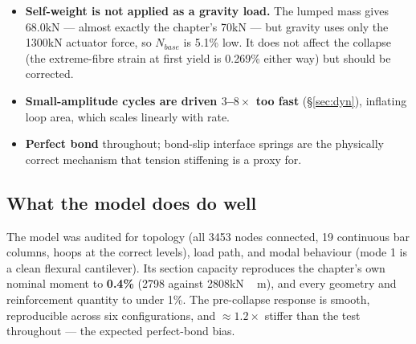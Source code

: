 \documentclass[11pt,a4paper]{article}
\begin{document}
\begin{itemize}\itemsep2pt
\item \textbf{Self-weight is not applied as a gravity load.} The lumped mass gives 68.0\unit{kN} ---
almost exactly the chapter's 70\unit{kN} --- but gravity uses only the 1300\unit{kN} actuator force,
so $N_{base}$ is 5.1\% low. It does not affect the collapse (the extreme-fibre strain at first yield
is 0.269\% either way) but should be corrected.
\item \textbf{Small-amplitude cycles are driven $3$--$8\times$ too fast} (\S\ref{sec:dyn}), inflating
loop area, which scales linearly with rate.
\item \textbf{Perfect bond} throughout; bond-slip interface springs are the physically correct
mechanism that tension stiffening is a proxy for.
\end{itemize}

\subsection{What the model does do well}

The model was audited for topology (all 3453 nodes connected, 19 continuous bar columns, hoops at
the correct levels), load path, and modal behaviour (mode 1 is a clean flexural cantilever). Its
section capacity reproduces the chapter's own nominal moment to \textbf{0.4\%} (2798 against
2808\unit{kN\,m}), and every geometry and reinforcement quantity to under 1\%. The pre-collapse
response is smooth, reproducible across six configurations, and $\approx1.2\times$ stiffer than the
test throughout --- the expected perfect-bond bias.
\end{document}
